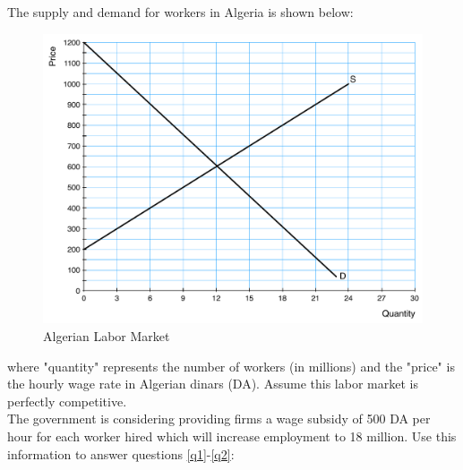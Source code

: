 \documentclass[addpoints,11pt]{exam}
\theoremstyle{definition}
\begin{document}
The supply and demand for workers in Algeria is shown below:

\begin{figure}[H]
	\centering
	\includegraphics[scale=.45]{Exam1_MC16.pdf}
	\caption{Algerian Labor Market}
\end{figure}


where "quantity" represents the number of workers (in millions) and the "price" is the hourly wage rate in Algerian dinars (DA). Assume this labor market is perfectly competitive.
\\

The government is considering providing firms a wage subsidy of 500 DA per hour for each worker hired which will increase employment to 18 million. Use this information to answer questions \ref{q1}-\ref{q2}: 
\end{document}
